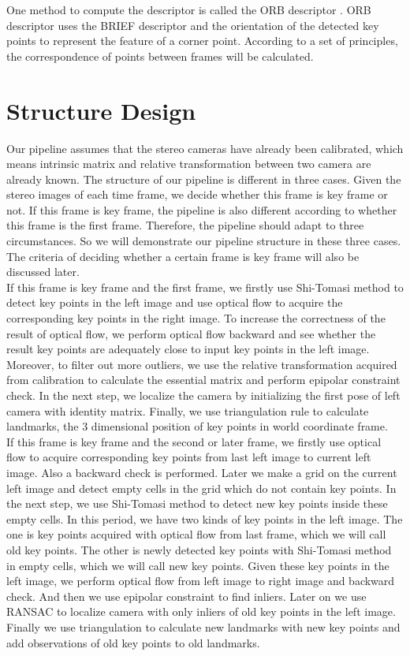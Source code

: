 \documentclass[conference]{IEEEtran}
\begin{document}
One method to compute the descriptor is called the ORB descriptor \cite{orb}. ORB descriptor uses the BRIEF descriptor \cite{brief} and the orientation of the detected key points to represent the feature of a corner point. According to a set of principles, the correspondence of points between frames will be calculated.
  
\section{Structure Design}
Our pipeline assumes that the stereo cameras have already been calibrated, which means intrinsic matrix and relative transformation between two camera are already known. The structure of our pipeline is different in three cases. Given the stereo images of each time frame, we decide whether this frame is key frame or not. If this frame is key frame, the pipeline is also different according to whether this frame is the first frame. Therefore, the pipeline should adapt to three circumstances. So we will demonstrate our pipeline structure in these three cases. The criteria of deciding whether a certain frame is key frame will also be discussed later.\\

If this frame is key frame and the first frame, we firstly use Shi-Tomasi method to detect key points in the left image and use optical flow to acquire the corresponding key points in the right image. To increase the correctness of the result of optical flow, we perform optical flow backward and see whether the result key points are adequately close to input key points in the left image. Moreover, to filter out more outliers, we use the relative transformation acquired from calibration to calculate the essential matrix and perform epipolar constraint check. In the next step, we localize the camera by initializing the first pose of left camera with identity matrix. Finally, we use triangulation rule to calculate landmarks, the 3 dimensional position of key points in world coordinate frame. \\

If this frame is key frame and the second or later frame, we firstly use optical flow to acquire corresponding key points from last left image to current left image. Also a backward check is performed. Later we make a grid on the current left image and detect empty cells in the grid which do not contain key points. In the next step, we use Shi-Tomasi method to detect new key points inside these empty cells. In this period, we have two kinds of key points in the left image. The one is key points acquired with optical flow from last frame, which we will call old key points. The other is newly detected key points with Shi-Tomasi method in empty cells, which we will call new key points. Given these key points in the left image, we perform optical flow from left image to right image and backward check. And then we use epipolar constraint to find inliers. Later on we use RANSAC to localize camera with only inliers of old key points in the left image. Finally we use triangulation to calculate new landmarks with new key points and add observations of old key points to old landmarks.\\
\end{document}
